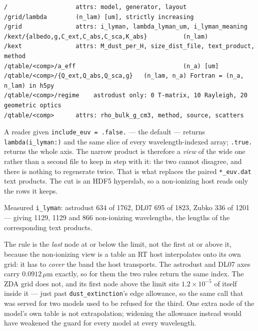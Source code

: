 \documentclass{my_memo}
\newcommand{\code}[1]{\texttt{#1}}
\newcommand{\um}{\ensuremath{\,\mu\mathrm{m}}}
\begin{document}
\begin{lstlisting}
/                   attrs: model, generator, layout
/grid/lambda        (n_lam) [um], strictly increasing
/grid               attrs: i_lyman, lambda_lyman_um, i_lyman_meaning
/kext/{albedo,g,C_ext,C_abs,C_sca,K_abs}          (n_lam)
/kext               attrs: M_dust_per_H, size_dist_file, text_product, method
/qtable/<comp>/a_eff                              (n_a) [um]
/qtable/<comp>/{Q_ext,Q_abs,Q_sca,g}   (n_lam, n_a) Fortran = (n_a, n_lam) in h5py
/qtable/<comp>/regime    astrodust only: 0 T-matrix, 10 Rayleigh, 20 geometric optics
/qtable/<comp>      attrs: rho_bulk_g_cm3, method, source, scatters
\end{lstlisting}

A reader given \code{include\_euv = .false.} --- the default --- returns
\code{lambda(i\_lyman:)} and the same slice of every wavelength-indexed array;
\code{.true.} returns the whole axis. The narrow product is therefore a
\emph{view} of the wide one rather than a second file to keep in step with it:
the two cannot disagree, and there is nothing to regenerate twice. That is what
replaces the paired \code{*\_euv.dat} text products. The cut is an HDF5
hyperslab, so a non-ionizing host reads only the rows it keeps.

Measured \code{i\_lyman}: astrodust 634 of 1762, DL07 695 of 1823, Zubko 336 of
1201 --- giving 1129, 1129 and 866 non-ionizing wavelengths, the lengths of the
corresponding text products.

The rule is the \emph{last} node at or below the limit, not the first at or
above it, because the non-ionizing view is a table an RT host interpolates onto
its own grid: it has to \emph{cover} the band the host transports. The
astrodust and DL07 axes carry $0.0912$\um{} exactly, so for them the two rules
return the same index. The ZDA grid does not, and its first node above the
limit sits $1.2\times10^{-5}$ of itself inside it --- just past
\code{dust\_extinction}'s edge allowance, so the same call that was served for
two models used to be refused for the third. One extra node of the model's own
table is not extrapolation; widening the allowance instead would have weakened
the guard for every model at every wavelength.
\end{document}
